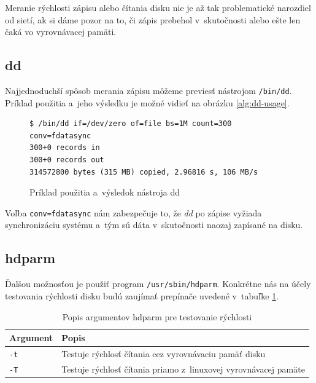 Meranie rýchlosti zápisu alebo čítania disku nie je až tak problematické
narozdiel od sietí, ak si dáme pozor na to, či zápis prebehol v~skutočnosti
alebo ešte len čaká vo vyrovnávacej pamäti.

%
%

\subsection*{dd}

Najjednoduchší spôsob merania zápisu môžeme previesť
nástrojom \texttt{/bin/dd}. Príklad použitia a~jeho výsledku je možné vidieť na
obrázku \ref{alg:dd-usage}.

\begin{figure}[H]
\begin{lstlisting}[label=alg:dd-usage]
$ /bin/dd if=/dev/zero of=file bs=1M count=300 conv=fdatasync
300+0 records in
300+0 records out
314572800 bytes (315 MB) copied, 2.96816 s, 106 MB/s
\end{lstlisting}
\caption{Príklad použitia a~výsledok nástroja dd}
\end{figure}

Voľba \texttt{conv=fdatasync} nám zabezpečuje to, že \emph{dd} po zápise
vyžiada synchronizáciu systému a~tým sú dáta v~skutočnosti naozaj zapísané na
disku.

%
%

\subsection*{hdparm}

Ďalšou možnosťou je použiť program \texttt{/usr/sbin/hdparm}. Konkrétne nás na účely testovania rýchlosti disku budú zaujímať prepínače uvedené v~tabuľke \ref{tab:hdparm-args}.

\begin{table}[H]
\begin{center}
\begin{tabular}{|l|l|}
    \hline
    \textbf{Argument} & \textbf{Popis} \\
    \hline
    \texttt{-t}  & Testuje rýchlosť čítania cez vyrovnávaciu pamäť disku \\
    \texttt{-T}  & Testuje rýchlosť čítania priamo z~linuxovej vyrovnávacej pamäte \\
    \hline
\end{tabular}
\caption{Popis argumentov hdparm pre testovanie rýchlosti}
\label{tab:hdparm-args}
\end{center}
\end{table}

